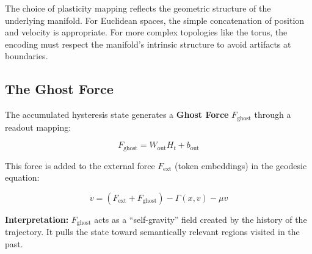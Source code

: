 \documentclass[12pt,a4paper]{article}
\begin{document}
The choice of plasticity mapping reflects the geometric structure of the underlying manifold. For Euclidean spaces, the simple concatenation of position and velocity is appropriate. For more complex topologies like the torus, the encoding must respect the manifold's intrinsic structure to avoid artifacts at boundaries.

\subsection{The Ghost Force}

The accumulated hysteresis state generates a \textbf{Ghost Force} $F_{\text{ghost}}$ through a readout mapping:

\begin{equation}
F_{\text{ghost}} = W_{\text{out}} H_t + b_{\text{out}}
\end{equation}

This force is added to the external force $F_{\text{ext}}$ (token embeddings) in the geodesic equation:

\begin{equation}
\dot{v} = (F_{\text{ext}} + F_{\text{ghost}}) - \Gamma(x, v) - \mu v
\end{equation}

\textbf{Interpretation:} $F_{\text{ghost}}$ acts as a ``self-gravity'' field created by the history of the trajectory. It pulls the state toward semantically relevant regions visited in the past.
\end{document}
